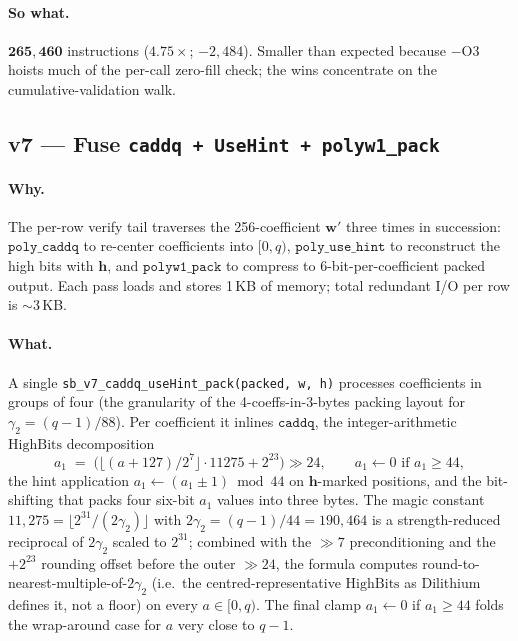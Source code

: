 \documentclass[11pt,a4paper]{article}
\newcommand{\HighBits}{\mathrm{HighBits}}
\begin{document}
\paragraph{So what.} $\mathbf{265{,}460}$ instructions
($\mathbf{4.75\times}$; $-2{,}484$). Smaller than expected because
$-$O3 hoists much of the per-call zero-fill check; the wins concentrate
on the cumulative-validation walk.

\subsection{v7 --- Fuse \texttt{caddq + UseHint + polyw1\_pack}}

\paragraph{Why.} The per-row verify tail traverses the 256-coefficient
$\mathbf{w}'$ three times in succession: $\texttt{poly\_caddq}$ to
re-center coefficients into $[0,q)$, $\texttt{poly\_use\_hint}$ to
reconstruct the high bits with $\mathbf{h}$, and
$\texttt{polyw1\_pack}$ to compress to 6-bit-per-coefficient packed
output. Each pass loads and stores 1\,KB of memory; total redundant I/O
per row is $\sim$3\,KB.

\paragraph{What.} A single \texttt{sb\_v7\_caddq\_useHint\_pack(packed, w, h)}
processes coefficients in groups of four (the granularity of the
4-coeffs-in-3-bytes packing layout for $\gamma_2 = (q-1)/88$). Per
coefficient it inlines $\texttt{caddq}$, the integer-arithmetic
$\HighBits$ decomposition
\[
  a_1 \;=\; \big( \lfloor (a + 127)/2^7 \rfloor \cdot 11275 + 2^{23} \big) \gg 24,
  \qquad a_1 \gets 0 \text{ if } a_1 \ge 44,
\]
the hint application $a_1 \gets (a_1 \pm 1) \bmod 44$ on
$\mathbf{h}$-marked positions, and the bit-shifting that packs four
six-bit $a_1$ values into three bytes. The magic constant
$11{,}275 = \lfloor 2^{31}/(2\gamma_2) \rfloor$ with
$2\gamma_2 = (q-1)/44 = 190{,}464$ is a strength-reduced reciprocal
of $2\gamma_2$ scaled to $2^{31}$; combined with the $\gg 7$
preconditioning and the $+2^{23}$ rounding offset before the outer
$\gg 24$, the formula computes round-to-nearest-multiple-of-$2\gamma_2$
(i.e.\ the centred-representative $\HighBits$ as Dilithium defines it,
not a floor) on every $a \in [0, q)$. The final clamp $a_1 \gets 0$ if
$a_1 \ge 44$ folds the wrap-around case for $a$ very close to $q-1$.
\end{document}
